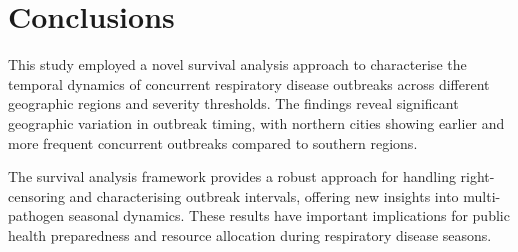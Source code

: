 \section{Conclusions}


This study employed a novel survival analysis approach to characterise the temporal dynamics of concurrent respiratory disease outbreaks across different geographic regions and severity thresholds. The findings reveal significant geographic variation in outbreak timing, with northern cities showing earlier and more frequent concurrent outbreaks compared to southern regions.


The survival analysis framework provides a robust approach for handling right-censoring and characterising outbreak intervals, offering new insights into multi-pathogen seasonal dynamics. These results have important implications for public health preparedness and resource allocation during respiratory disease seasons.




